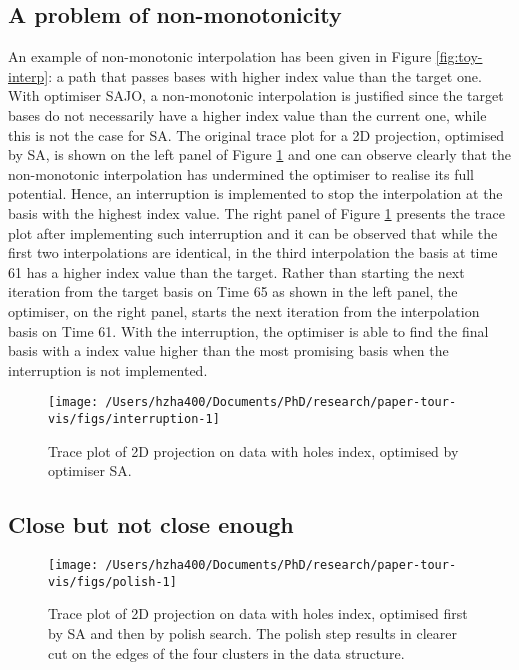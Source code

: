 \hypertarget{monotonic}{%
\subsection{A problem of non-monotonicity}\label{monotonic}}

An example of non-monotonic interpolation has been given in Figure
\ref{fig:toy-interp}: a path that passes bases with higher index value
than the target one. With optimiser SAJO, a non-monotonic interpolation
is justified since the target bases do not necessarily have a higher
index value than the current one, while this is not the case for SA. The
original trace plot for a 2D projection, optimised by SA, is shown on
the left panel of Figure \ref{fig:interruption} and one can observe
clearly that the non-monotonic interpolation has undermined the
optimiser to realise its full potential. Hence, an interruption is
implemented to stop the interpolation at the basis with the highest
index value. The right panel of Figure \ref{fig:interruption} presents
the trace plot after implementing such interruption and it can be
observed that while the first two interpolations are identical, in the
third interpolation the basis at time 61 has a higher index value than
the target. Rather than starting the next iteration from the target
basis on Time 65 as shown in the left panel, the optimiser, on the right
panel, starts the next iteration from the interpolation basis on Time
61. With the interruption, the optimiser is able to find the final basis
with a index value higher than the most promising basis when the
interruption is not implemented.

\begin{Schunk}
\begin{figure}
\texttt{[image: /Users/hzha400/Documents/PhD/research/paper-tour-vis/figs/interruption-1]} \caption[Trace plot of 2D projection on  data with holes index, optimised by optimiser SA]{Trace plot of 2D projection on  data with holes index, optimised by optimiser SA.}\label{fig:interruption}
\end{figure}
\end{Schunk}

\hypertarget{close-but-not-close-enough}{%
\subsection{Close but not close
enough}\label{close-but-not-close-enough}}

\begin{Schunk}
\begin{figure}
\texttt{[image: /Users/hzha400/Documents/PhD/research/paper-tour-vis/figs/polish-1]} \caption[Trace plot of 2D projection on  data with holes index, optimised first by SA and then by polish search]{Trace plot of 2D projection on  data with holes index, optimised first by SA and then by polish search. The polish step results in clearer cut on the edges of the four clusters in the data structure.}\label{fig:polish}
\end{figure}
\end{Schunk}

